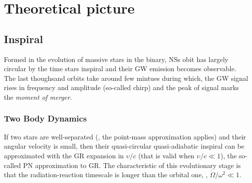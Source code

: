 


\section{Theoretical picture}


\subsection{Inspiral}

Formed in the evolution of massive stars in the binary, \acp{NS} obit has largely circular 
\cite{4} by the time stars inspiral and their \ac{GW} emission becomes observable. 
The last thoughsand orbits take around few mintues during which, the \ac{GW} signal rises 
in frequency and amplitude (so-called chirp) and the peak of signal marks the 
\textit{moment of merger}.

\subsubsection{Two Body Dynamics}

If two stars are well-separated (\ie, the point-mass approximation applies) and their 
angular velocity is small, then their quasi-circular
quasi-adiabatic inspiral can be approximated with the \ac{GR} expansion in $\upsilon/c$ 
(that is valid when $\upsilon/c \ll 1$), the so-called \ac{PN} approximation to \ac{GR}.
The characteristic of this evolutionary stage is that the radiation-reaction timescale 
is longer than the orbital one, \ie, $\dot{\Omega}/\omega^2\ll 1$.

